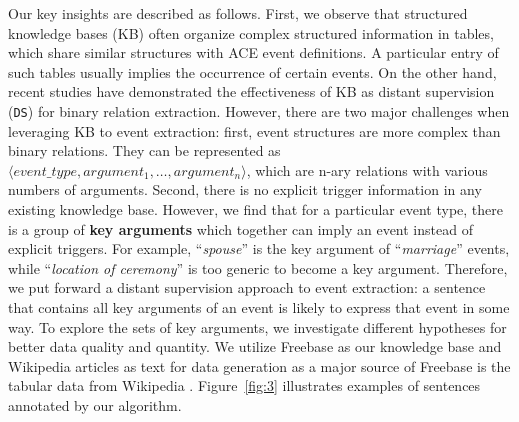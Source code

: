 Our key insights are described as follows.
First, we observe that structured knowledge bases (KB) often organize
complex structured information in tables, which share similar structures with ACE event definitions. A particular entry of such tables usually implies the occurrence of certain events.
On the other hand, recent studies \cite{mintz2009distant,zeng2015distant} have demonstrated the effectiveness of KB as distant supervision (\texttt{DS}) for binary relation extraction.
However, there are two major challenges when leveraging KB to event extraction: first, event structures are more complex than binary relations. They can be represented as $\langle event\_type, argument_1, \ldots, argument_n\rangle$, which are n-ary relations with various numbers of arguments. Second, there is no explicit trigger information in any existing knowledge base.
However, we find that for a particular event type, there is a group of \textbf{key arguments} which together can imply an event instead of explicit triggers. For example, ``\emph{spouse}'' is the key argument of ``\emph{marriage}'' events, while ``\emph{location of ceremony}'' is too generic to become a key argument. Therefore, we put forward a distant supervision approach to event extraction: a sentence that contains all key arguments of an event is likely to express that event in some way. To explore the sets of key arguments, we investigate different hypotheses for better data quality and quantity.
We utilize Freebase as our knowledge base and Wikipedia articles as text for data generation as a major source of Freebase is the tabular data from Wikipedia \cite{mintz2009distant}.
Figure~\ref{fig:3} illustrates examples of sentences annotated by our algorithm.

